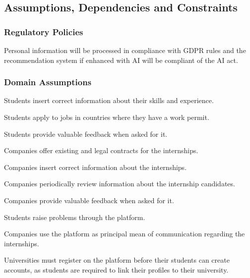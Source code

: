 \subsection{Assumptions, Dependencies and Constraints}
    \subsubsection{Regulatory Policies}
        Personal information will be processed in compliance with GDPR rules and the recommendation system if enhanced with AI will be compliant of the AI act.
    
    \subsubsection{Domain Assumptions}
    \begin{enumerate}[label={[D\arabic*]}]
        \item {Students insert correct information about their skills and experience.}
        \item {Students apply to jobs in countries where they have a work permit.}
        \item {Students provide valuable feedback when asked for it.}
        \item {Companies offer existing and legal contracts for the internships.}
        \item {Companies insert correct information about the internships.}
        \item {Companies periodically review information about the internship candidates.}
        \item {Companies provide valuable feedback when asked for it.}
        \item {Students raise problems through the platform.}
        \item {Companies use the platform as principal mean of communication regarding the internships.}
        \item {Universities must register on the platform before their students can create accounts, as students are required to link their profiles to their university.}
    \end{enumerate}